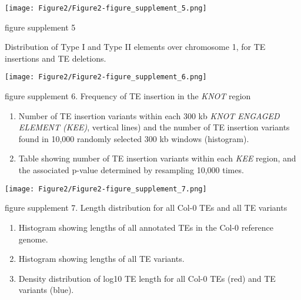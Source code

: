 \documentclass[12pt]{article}
\begin{document}
\pagebreak
\setcounter{suppfigure}{1}

\begin{suppfigure}
  \centering
  \texttt{[image: Figure2/Figure2-figure\_supplement\_5.png]}
  \caption{figure supplement 5}
  \label{fig2s5}
\end{suppfigure}

Distribution of Type I and Type II elements over chromosome 1, for TE insertions and TE deletions.

\pagebreak

\setcounter{suppfigure}{1}

\begin{suppfigure}
  \centering
  \texttt{[image: Figure2/Figure2-figure\_supplement\_6.png]}
  \caption{figure supplement 6. Frequency of TE insertion in the \emph{KNOT} region}
  \label{fig2s6}
\end{suppfigure}

\begin{enumerate}
  \def\labelenumi{(\Alph{enumi})}
\item
  Number of TE insertion variants within each 300 kb \emph{KNOT ENGAGED ELEMENT (KEE)},
  vertical lines) and the number of TE insertion variants
  found in 10,000 randomly selected 300 kb windows (histogram).
\item
  Table showing number of TE insertion variants within each \emph{KEE}
  region, and the associated p-value determined by resampling 10,000
  times.
\end{enumerate}

\pagebreak

\setcounter{suppfigure}{1}

\begin{suppfigure}
  \centering
  \texttt{[image: Figure2/Figure2-figure\_supplement\_7.png]}
  \caption{figure supplement 7. Length distribution for all Col-0 TEs and all TE variants}
  \label{fig2s7}
\end{suppfigure}

\begin{enumerate}
  \def\labelenumi{(\Alph{enumi})}
\item
  Histogram showing lengths of all annotated TEs in the Col-0 reference
  genome.
\item
  Histogram showing lengths of all TE variants.
\item
  Density distribution of log10 TE length for all Col-0 TEs (red) and TE
  variants (blue).
\end{enumerate}
\end{document}
